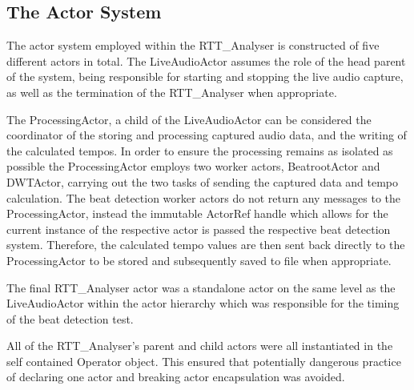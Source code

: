 \documentclass[a4paper, 11pt]{article}
\begin{document}
\subsection{The Actor System}
The actor system employed within the RTT\_Analyser is constructed of five different actors in total. The LiveAudioActor assumes the role of the head parent of the system, being responsible for starting and stopping the live audio capture, as well as the termination of the RTT\_Analyser when appropriate. \par

The ProcessingActor, a child of the LiveAudioActor can be considered the coordinator of the storing and processing captured audio data, and the writing of the calculated tempos. In order to ensure the processing remains as isolated as possible the ProcessingActor employs two worker actors, BeatrootActor and DWTActor, carrying out the two tasks of sending the captured data and tempo calculation. The beat detection worker actors do not return any messages to the ProcessingActor, instead the immutable ActorRef handle which allows for the current instance of the respective actor is passed the respective beat detection system. Therefore, the calculated tempo values are then sent back directly to the ProcessingActor to be stored and subsequently saved to file when appropriate.\par

The final RTT\_Analyser actor was a standalone actor on the same level as the LiveAudioActor within the actor hierarchy which was responsible for the timing of the beat detection test.\par

All of the RTT\_Analyser's parent and child actors were all instantiated in the self contained Operator object. This ensured that potentially dangerous practice of declaring one actor and breaking actor encapsulation\cite{akkaActors} was avoided.  
\end{document}
